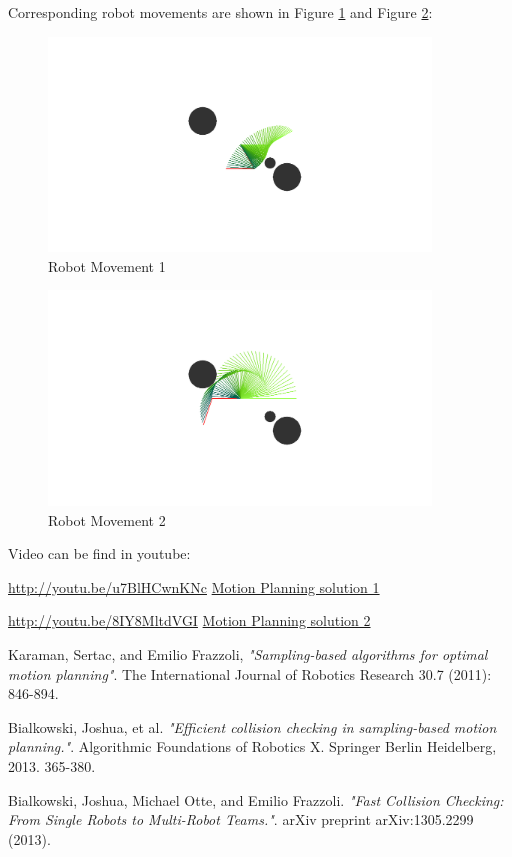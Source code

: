 \documentclass{article}
\begin{document}
    Corresponding robot movements are shown in Figure \ref{fig:move1} and Figure \ref{fig:move2}:

    \begin{figure}
      \centering
      \includegraphics[width=4in]{Movement1.PNG}
      \caption{Robot Movement 1}
      \label{fig:move1}
    \end{figure}

    \begin{figure}
      \centering
      \includegraphics[width=4in]{Movement2.PNG}
      \caption{Robot Movement 2}
      \label{fig:move2}
    \end{figure}

    Video can be find in youtube: 
    
    \url{http://youtu.be/u7BlHCwnKNc}
    \href{http://youtu.be/u7BlHCwnKNc}{ Motion Planning solution 1 }

    \url{http://youtu.be/8IY8MltdVGI}
    \href{http://youtu.be/8IY8MltdVGI}{ Motion Planning solution 2 }

    

\begin{thebibliography}{9}

  Karaman, Sertac, and Emilio Frazzoli,
  \emph{"Sampling-based algorithms for optimal motion planning"}.
  The International Journal of Robotics Research 30.7 (2011): 846-894.

  Bialkowski, Joshua, et al.
  \emph{"Efficient collision checking in sampling-based motion planning."}. Algorithmic Foundations of Robotics X. Springer Berlin Heidelberg, 2013. 365-380.

  Bialkowski, Joshua, Michael Otte, and Emilio Frazzoli. 
  \emph{"Fast Collision Checking: From Single Robots to Multi-Robot Teams."}. 
  arXiv preprint arXiv:1305.2299 (2013).

\end{thebibliography}
\end{document}
